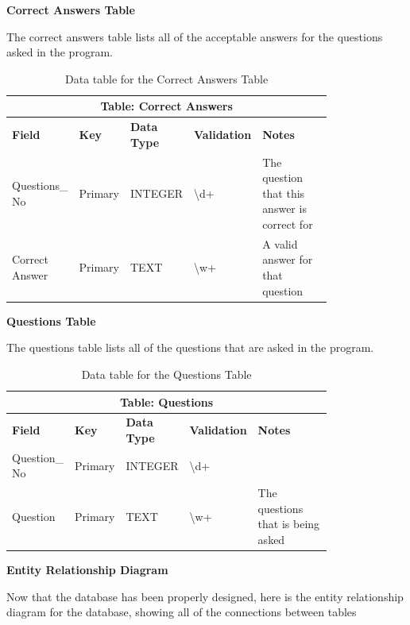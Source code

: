 \documentclass{article}
\begin{document}
\textbf{Correct Answers Table}

The correct answers table lists all of the acceptable answers for the questions asked in the program.

\begin{table}[ht]
    \centering
    \begin{tabular}{ | p{0.15\linewidth} | p{0.1\linewidth} | p{0.16\linewidth} | p{0.14\linewidth} | p{0.25\linewidth} | }
    \hline
    \multicolumn{5}{|c|}{\textbf{Table: Correct Answers}}\\
    \hline
    \hline
    \textbf{Field} & \textbf{Key} & \textbf{Data Type} & \textbf{Validation} & \textbf{Notes} \\
    \hline
    Questions\_ No & Primary & INTEGER & \textbackslash d+ & The question that this answer is correct for\\
    \hline
    Correct \text{ } Answer & Primary & TEXT & \textbackslash w+ & A valid answer for that question\\
    \hline
    \end{tabular}
    \caption{Data table for the Correct Answers Table}
\end{table}

\textbf{Questions Table}

The questions table lists all of the questions that are asked in the program.

\begin{table}[ht]
    \centering
    \begin{tabular}{ | p{0.15\linewidth} | p{0.1\linewidth} | p{0.16\linewidth} | p{0.14\linewidth} | p{0.25\linewidth} | }
    \hline
    \multicolumn{5}{|c|}{\textbf{Table: Questions}}\\
    \hline
    \hline
    \textbf{Field} & \textbf{Key} & \textbf{Data Type} & \textbf{Validation} & \textbf{Notes} \\
    \hline
    Question\_ No & Primary & INTEGER & \textbackslash d+ &\\
    \hline
    Question & Primary & TEXT & \textbackslash w+ & The questions that is being asked\\
    \hline
    \end{tabular}
    \caption{Data table for the Questions Table}
\end{table}

\clearpage
\textbf{Entity Relationship Diagram}

Now that the database has been properly designed, here is the entity relationship diagram for the database, showing all of the connections between tables
\end{document}
